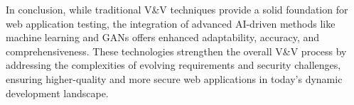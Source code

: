 \documentclass[a4paper, 11pt]{article}  %
\begin{document}
In conclusion, while traditional V\&V techniques provide a solid foundation for web application testing, the integration of advanced AI-driven methods like machine learning and GANs offers enhanced adaptability, accuracy, and comprehensiveness. These technologies strengthen the overall V\&V process by addressing the complexities of evolving requirements and security challenges, ensuring higher-quality and more secure web applications in today's dynamic development landscape.

\newpage
{} %

\end{document}
